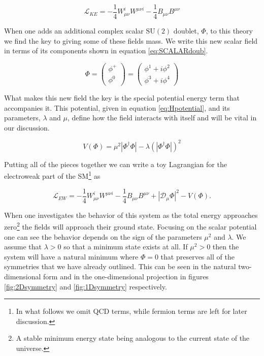 \begin{equation}
\label{eq:EW_KE}
\mathscr{L}_{KE} = -\frac{1}{4}W_{\mu \nu}^{i}W^{\mu \nu i} - \frac{1}{4}B_{\mu \nu}B^{\mu \nu}
\end{equation}

When one adds an additional complex scalar $\mathrm{SU}(2)$ doublet, $\Phi$, to this theory we find the key to giving some of these fields mass. We write this new scalar field in terms of its components shown in equation \eqref{eq:SCALARdoub}.

\begin{equation}
\label{eq:SCALARdoub}
\Phi = \begin{pmatrix} \phi^{+} \\ \phi^{0} \end{pmatrix} = \begin{pmatrix} \phi^{1} + i\phi^{2} \\ \phi^{3} + i\phi^{4} \end{pmatrix}
\end{equation}

What makes this new field the key is the special potential energy term that accompanies it. This potential, given in equation \eqref{eq:Hpotential}, and its parameters, $\lambda$ and $\mu$, define how the field interacts with itself and will be vital in our discussion.

\begin{equation}
\label{eq:Hpotential}
V\left(\Phi\right) = \mu^{2}\left|\Phi^{\dagger}\Phi\right| - \lambda\left(\left|\Phi^{\dagger}\Phi\right|\right)^{2}
\end{equation}

Putting all of the pieces together we can write a toy Lagrangian for the electroweak part of the SM\footnote{In what follows we omit QCD terms, while fermion terms are left for later discussion.} as

\begin{equation}
\label{eq:EWsector}
\mathscr{L}_{EW} = -\frac{1}{4}W_{\mu \nu}^{i}W^{\mu \nu i} - \frac{1}{4}B_{\mu \nu}B^{\mu \nu} + \left|\mathcal{D}_{\mu}\Phi\right|^{2} - V\left(\Phi\right).
\end{equation}

When one investigates the behavior of this system as the total energy approaches zero\footnote{A stable minimum energy state being analogous to the current state of the universe.} the fields will approach their ground state. Focusing on the scalar potential one can see the behavior depends on the sign of the parameters $\mu^{2}$ and $\lambda$. We assume that $\lambda > 0$ so that a minimum state exists at all. If $\mu^2 > 0$ then the system will have a natural minimum where $\Phi = 0$ that preserves all of the symmetries that we have already outlined. This can be seen in the natural two-dimensional form and in the one-dimensional projection in figures \ref{fig:2Dsymmetry} and \ref{fig:1Dsymmetry} respectively. 

